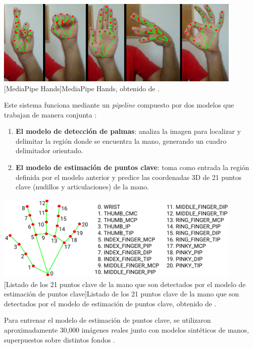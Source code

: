 \begin{center}
    \includegraphics[width=0.9\textwidth]{Images/Cap 2/MediaPipe_Hands.png}
    [MediaPipe Hands]{MediaPipe Hands, obtenido de \cite{ref51}.}  %
\end{center}

Este sistema funciona mediante un \textit{pipeline} compuesto por dos modelos que trabajan de manera conjunta \cite{ref51}:

\begin{enumerate}
    \item \textbf{El modelo de detección de palmas}: analiza la imagen para localizar y delimitar la región donde se encuentra la mano, generando un cuadro delimitador orientado.
    \item \textbf{El modelo de estimación de puntos clave}: toma como entrada la región definida por el modelo anterior y predice las coordenadas 3D de 21 puntos clave (nudillos y articulaciones) de la mano.
\end{enumerate}

\begin{center}
\includegraphics[width=0.9\textwidth]{Images/Cap 2/MediaPipe_hand_landmarks.png}
[Listado de los 21 puntos clave de la mano que son detectados por el modelo de estimación de puntos clave]{Listado de los 21 puntos clave de la mano que son detectados por el modelo de estimación de puntos clave, obtenido de \cite{ref52}.}  %
\end{center}


Para entrenar el modelo de estimación de puntos clave, se utilizaron aproximadamente 30,000 imágenes reales junto con modelos sintéticos de manos, superpuestos sobre distintos fondos \cite{ref52}.\\


